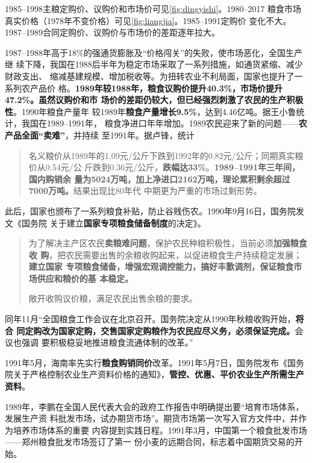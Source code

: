 



1985--1998主粮定购价、议购价和市场价可见\cref{fig:dingyishi}。1980--2017
粮食市场真实价格（1978年不变价格）可见\cref{fig:liangjia}。1985--1991定购价
变化不大。1987--1989合同定购价、议购价与市场价的差距逐年拉大。


1987--1988年高于18\%的强通货膨胀及“价格闯关”的失败，使市场恶化，全国生产继
续下降，我国在1988后半年为稳定市场采取了一系列措施，如通货紧缩、减少财政支出、
缩减基建规模、增加税收等。为扭转农业不利局面，国家也提升了一系列农产品价
格。\textbf{1989年较1988年，粮食议购价提升40.3\%，市场价提升47.2\%。虽然议购价和市
  场价的差距仍较大，但已经强烈刺激了农民的生产积极性}。1990年粮食产量年
较1989年\textbf{粮食产量增长9.5\%}，达到4.46亿吨。据王小鲁统计，我国在1989--1991年，
粮食净进口年年增加。1989农民迎来了新的问题——\textbf{农产品全面“卖难”}，并持续
至1991年。据卢锋，统计
\begin{quotation}
  名义粮价从1989年的1.09元/公斤下跌到1992年的0.82元/公斤；同期真实粮价从0.54元/公
  斤跌到0.36元/公斤，\textbf{跌幅达33\%}。\textbf{1989--1991年三年间，国内购销余
    量为5024万吨，加上净进口2162万吨，理论累积剩余超过7000万吨。}结果出现比80年代
  中期更为严重的市场过剩形势。
\end{quotation}

此后，国家也颁布了一系列粮食补贴，防止谷贱伤农。1990年9月16日，国务院发文《国务院
关于建立\textbf{国家专项粮食储备制度}的决定》。
\begin{quotation}
  为了解决主产区农民\textbf{卖粮难问题}，保护农民种粮积极性，当前必须\textbf{加强粮食收
    购}，把农民需要出售的余粮收购起来，以促进粮食生产持续稳定发展；\textbf{建立国家
    专项粮食储备，增强宏观调控能力，搞好丰歉调剂，保证粮食市场供应和粮价的基
    本稳定。}

  敞开收购议价粮，满足农民出售余粮的要求。
\end{quotation}

同年11月“全国粮食工作会议在北京召开。国务院决定从1990年秋粮收购开始，\textbf{将合
  同定购改为国家定购，交售国家定购粮作为农民应尽义务，必须保证完成。}会议也强调
要积极稳妥地推进粮食流通体制的改革。”

1991年5月，海南率先实行\textbf{粮食购销同价}改革。1991年5月7日，国务院发布《国务
院关于严格控制农业生产资料价格的通知》，\textbf{管控、优惠、平价农业生产所需生产
  资料}。

1989年，李鹏在全国人民代表大会的政府工作报告中明确提出要“培育市场体系，发展生产资
料批发市场，试办期货市场”。期货市场第一次写入官方文件中，并作为培养市场体系的重要
内容提到实践日程。1991年3月，中国第一个粮食批发市场——郑州粮食批发市场签订了第一
份小麦的远期合同，标志着中国期货交易的开始。\cite{taochangsheng}


